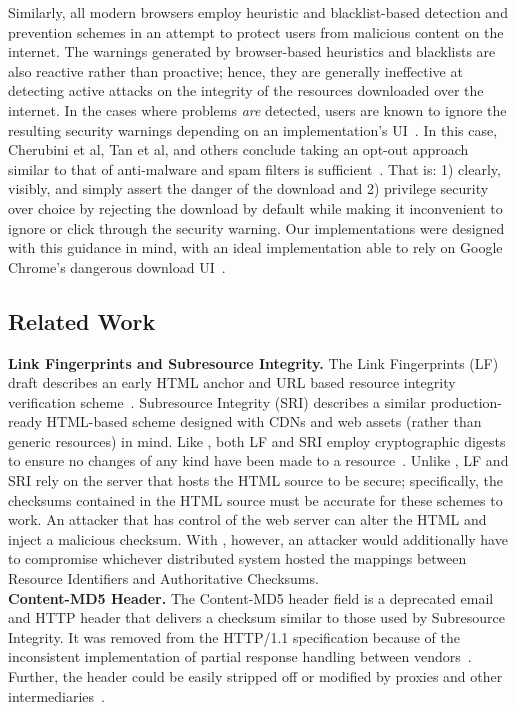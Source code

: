 Similarly, all modern browsers employ heuristic and blacklist-based detection
and prevention schemes in an attempt to protect users from malicious content on
the internet. The warnings generated by browser-based heuristics and blacklists
are also reactive rather than proactive; hence, they are generally ineffective
at detecting active attacks on the integrity of the resources downloaded over
the internet. In the cases where problems \emph{are} detected, users are known
to ignore the resulting security warnings depending on an implementation's
UI~\cite{Clickthrough, Modic, Akhawe, ChromeClickThrough}. In this case,
Cherubini et al, Tan et al, and others conclude taking an opt-out approach
similar to that of anti-malware and spam filters is sufficient~\cite{Cherubini,
Tan}. That is: 1) clearly, visibly, and simply assert the danger of the download
and 2) privilege security over choice by rejecting the download by default while
making it inconvenient to ignore or click through the security warning. Our
\SYSTEM{} implementations were designed with this guidance in mind, with an
ideal implementation able to rely on Google Chrome's dangerous download
UI~\cite{ChromeClickThrough}.

\subsection{Related Work}

\noindent\textbf{Link Fingerprints and Subresource Integrity.} The Link
Fingerprints (LF) draft describes an early HTML anchor and URL based resource
integrity verification scheme~\cite{LF}. Subresource Integrity (SRI) describes a
similar production-ready HTML-based scheme designed with CDNs and web assets
(rather than generic resources) in mind. Like \SYSTEM{}, both LF and SRI employ
cryptographic digests to ensure no changes of any kind have been made to a
resource~\cite{SRI}. Unlike \SYSTEM{}, LF and SRI rely on the server that hosts
the HTML source to be secure; specifically, the checksums contained in the HTML
source must be accurate for these schemes to work. An attacker that has control
of the web server can alter the HTML and inject a malicious checksum. With
\SYSTEM{}, however, an attacker would additionally have to compromise whichever
distributed system hosted the mappings between Resource Identifiers and
Authoritative Checksums. \\

\noindent\textbf{Content-MD5 Header.} The Content-MD5 header field is a
deprecated email and HTTP header that delivers a checksum similar to those used
by Subresource Integrity. It was removed from the HTTP/1.1 specification because
of the inconsistent implementation of partial response handling between
vendors~\cite{HTTP1.1}. Further, the header could be easily stripped off or
modified by proxies and other intermediaries~\cite{MD5Header}. \\

